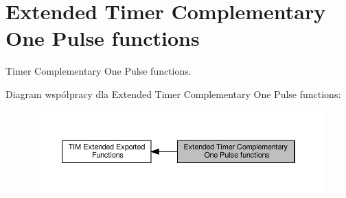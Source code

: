\hypertarget{group___t_i_m_ex___exported___functions___group4}{}\section{Extended Timer Complementary One Pulse functions}
\label{group___t_i_m_ex___exported___functions___group4}


Timer Complementary One Pulse functions.  


Diagram współpracy dla Extended Timer Complementary One Pulse functions\+:\nopagebreak
\begin{figure}[H]
\begin{center}
\leavevmode
\includegraphics[width=350pt]{group___t_i_m_ex___exported___functions___group4}
\end{center}
\end{figure}
